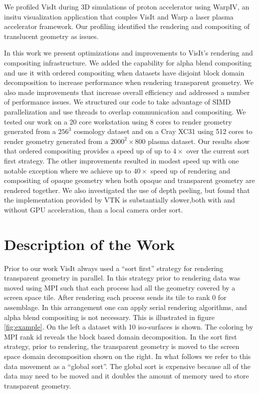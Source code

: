 \documentclass[a4paper,10pt]{report}
\begin{document}
We profiled VisIt during 3D simulations of proton accelerator using WarpIV, an insitu visualization application that couples VisIt and Warp a laser plasma accelerator framework. Our profiling identified the rendering and compositing of translucent geometry as issues.

In this work we present optimizations and improvements to VisIt's rendering and compositing infrastructure. We added the capability for alpha blend compositing and use it with ordered compositing when datasets have disjoint block domain decomposition to increase performance when rendering transparent geometry. We also made improvements that increase overall efficiency and addressed a number of performance issues. We structured our code to take advantage of SIMD parallelization and use threads to overlap communication and compositing. We tested our work on a 20 core workstation using 8 cores to render geometry generated from a $256^3$ cosmology dataset and on a Cray XC31 using 512 cores to render geometry generated from a $2000^2 \times 800$ plasma dataset. Our results show that ordered compositing provides a speed up of up to $4 \times$ over the current sort first strategy. The other improvements resulted in modest speed up with one notable exception where we achieve up to $40 \times$ speed up of rendering and compositing of opaque geometry when both opaque and transparent geometry are rendered together. We also investigated the use of depth peeling, but found that the implementation provided by VTK is substantially slower,both with and without GPU acceleration, than a local camera order sort.

\section{Description of the Work}
Prior to our work VisIt always used a ``sort first'' strategy for rendering transparent geometry in parallel. In this strategy prior to rendering data was moved using MPI such that each process had all the geometry covered by a screen space tile. After rendering each process sends its tile to rank 0 for assemblage. In this arrangement one can apply serial rendering algorithms, and alpha blend compositing is not necessary. This is illustrated in figure \ref{fig:example}. On the left a dataset with 10 iso-surfaces is shown. The coloring by MPI rank id reveals the block based domain decomposition. In the sort first strategy, prior to rendering, the transparent geometry is moved to the screen space domain decomposition shown on the right. In what follows we refer to this data movement as a ``global sort''. The global sort is expensive because all of the data may need to be moved and it doubles the amount of memory used to store transparent geometry.
\end{document}

